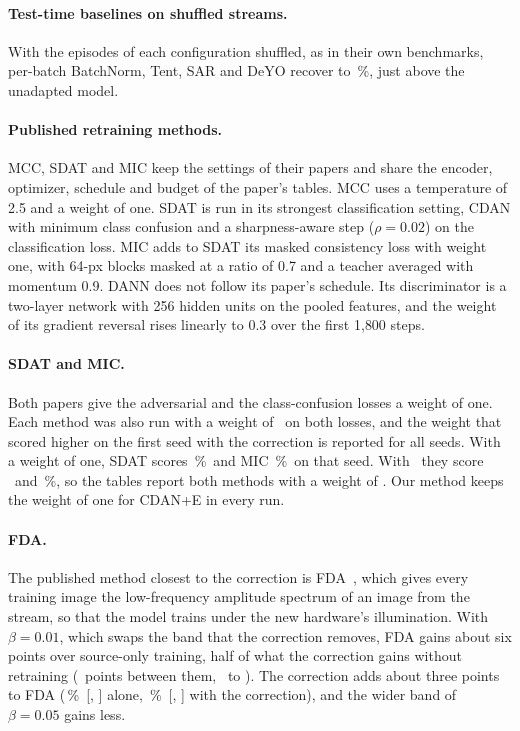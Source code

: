 \documentclass[10pt,twocolumn,letterpaper]{article}
\newcommand{\pct}{\,\%}
\begin{document}
\paragraph{Test-time baselines on shuffled streams.} With the episodes of each configuration shuffled, as in their own benchmarks, per-batch BatchNorm, Tent, SAR and DeYO recover to \XpTtaBnIidAcc\pct, just above the unadapted model.
\paragraph{Published retraining methods.} MCC, SDAT and MIC keep the settings of their papers and share the encoder, optimizer, schedule and budget of the paper's tables. MCC uses a temperature of 2.5 and a weight of one. SDAT is run in its strongest classification setting, CDAN with minimum class confusion and a sharpness-aware step ($\rho=0.02$) on the classification loss. MIC adds to SDAT its masked consistency loss with weight one, with 64-px blocks masked at a ratio of 0.7 and a teacher averaged with momentum 0.9. DANN does not follow its paper's schedule. Its discriminator is a two-layer network with 256 hidden units on the pooled features, and the weight of its gradient reversal rises linearly to 0.3 over the first 1{,}800 steps.
\paragraph{SDAT and MIC.} Both papers give the adversarial and the class-confusion losses a weight of one. Each method was also run with a weight of \XpSdatWLowValue\ on both losses, and the weight that scored higher on the first seed with the correction is reported for all seeds. With a weight of one, SDAT scores \XpSdatWOneSeedZero\pct\ and MIC \XpMicWOneSeedZero\pct\ on that seed. With \XpSdatWLowValue\ they score \XpSdatWLowSeedZero\ and \XpMicWLowSeedZero\pct, so the tables report both methods with a weight of \XpSdatMicWeight. Our method keeps the weight of one for CDAN+E in every run.
\paragraph{FDA.} The published method closest to the correction is FDA~\cite{fda2020}, which gives every training image the low-frequency amplitude spectrum of an image from the stream, so that the model trains under the new hardware's illumination. With $\beta=0.01$, which swaps the band that the correction removes, FDA gains about six points over source-only training, half of what the correction gains without retraining (\XdReadVsFda\ points between them, \XdReadVsFdaLo\ to \XdReadVsFdaHi). The correction adds about three points to FDA (\XpFdaAcc\pct\ [\XpFdaLo, \XpFdaHi] alone, \XpFdaReadAcc\pct\ [\XpFdaReadLo, \XpFdaReadHi] with the correction), and the wider band of $\beta=0.05$ gains less.
\end{document}
